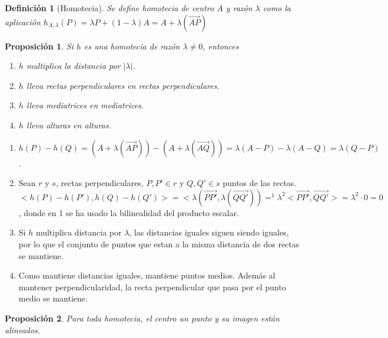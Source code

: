 \documentclass[11pt, a4paper, titlepage]{article}
\makeatletter
\renewenvironment{proof}[1][\proofname] {\vspace{-15pt}\par\pushQED{\qed}\normalfont\topsep6\p@\@plus6\p@\relax\trivlist\item[\hskip\labelsep\it#1\@addpunct{.}]\ignorespaces}{\popQED\endtrivlist\@endpefalse}
\renewcommand{\vec}{\overrightarrow}
\theoremstyle{theorem-style}
\newtheorem*{nprop}{Proposición}
\theoremstyle{definition-style}
\newtheorem*{ndef}{Definición}
\theoremstyle{remark-style}
\theoremstyle{example-style}
\makeatother
\begin{document}
\begin{ndef}[Homotecia]
  Se define homotecia de centro $A$ y razón $\lambda$ como la aplicación $h_{A,\lambda}(P) = \lambda P + (1-\lambda)A = A+\lambda(\vec{AP})$
\end{ndef}

\begin{nprop} Si $h$ es una homotecia de razón $\lambda\ne 0$, entonces 
\begin{enumerate}
\item $h$ multiplica la distancia por $|\lambda|$.
\item $h$ lleva rectas perpendiculares en rectas perpendiculares.
\item $h$ lleva mediatrices en mediatrices.
\item $h$ lleva alturas en alturas.
\end{enumerate}
\end{nprop}

\begin{proof}\hfill
\begin{enumerate}
	\item $h(P)-h(Q)=(A+\lambda(\vec{AP})) -(A+\lambda(\vec{AQ})) = \lambda(A-P) - \lambda(A-Q) = \lambda (Q-P)$.
	\item  Sean $r$ y $ s$, rectas perpendiculares, $P,P' \in r$ y $Q,Q'\in s$ puntos de las rectas. $<h(P) - h(P'),h(Q) - h(Q')> =  <\lambda (\vec{PP'}, \lambda(\vec {QQ'}))=^1 \lambda^2 <\vec{PP'},\vec{QQ'}> = \lambda^2 \cdot 0 = 0 $, donde en 1 se ha usado la bilinealidad del producto escalar.
	\item Si $h$ multiplica distancia por $\lambda$, las distancias iguales siguen siendo iguales, por lo que el conjunto de puntos que estan a la misma distancia de dos rectas se mantiene.
	\item Como mantiene distancias iguales, mantiene puntos medios. Además al mantener perpendicularidad, la recta perpendicular que pasa por el punto medio se mantiene.
\end{enumerate}
\end{proof}

\begin{nprop}
	
Para toda homotecia, el centro un punto y su imagen están alineados.
\end{nprop}
\begin{proof}
	
\end{proof}
\end{document}
